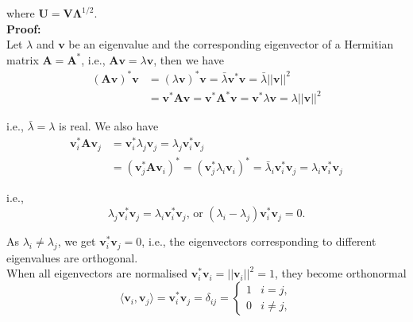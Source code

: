 \documentclass[10pt,b5paper,titlepage]{book}
\begin{document}
\begin{itemize}
where $\mathbf{U} = \mathbf{V}\mathbf{\Lambda}^{1/2}$.\\

\textbf{Proof:}\\

Let $\lambda$ and $\mathbf{v}$ be an eigenvalue and the corresponding eigenvector of a Hermitian matrix $\mathbf{A} = \mathbf{A}^{*}$, i.e., $\mathbf{A}\mathbf{v} = \lambda\mathbf{v}$, then we have
\begin{equation}
\begin{array}{ll}
(\mathbf{A}\mathbf{v})^{*}\mathbf{v} & = (\lambda\mathbf{v})^{*}\mathbf{v} = \bar{\lambda}\mathbf{v}^{*}\mathbf{v} = \bar{\lambda}||\mathbf{v}||^{2}\\
& = \mathbf{v}^{*}\mathbf{A}\mathbf{v} = \mathbf{v}^{*}\mathbf{A}^{*}\mathbf{v} = \mathbf{v}^{*}\lambda\mathbf{v} = \lambda||\mathbf{v}||^{2}
\end{array}
\end{equation}

i.e., $\bar{\lambda} = \lambda$ is real. We also have
\begin{equation}
\begin{array}{ll}
\mathbf{v}_{i}^{*}\mathbf{A}\mathbf{v}_{j} & = \mathbf{v}_{i}^{*}\lambda_{j}\mathbf{v}_{j} = \lambda_{j}\mathbf{v}_{i}^{*}\mathbf{v}_{j}\\
& = (\mathbf{v}_{j}^{*}\mathbf{A}\mathbf{v}_{i})^{*} = (\mathbf{v}_{j}^{*}\lambda_{i}\mathbf{v}_{i})^{*} = \bar{\lambda}_{i}\mathbf{v}_{i}^{*}\mathbf{v}_{j} = \lambda_{i}\mathbf{v}_{i}^{*}\mathbf{v}_{j}
\end{array}
\end{equation}

i.e.,
\begin{equation}
\lambda_{j}\mathbf{v}_{i}^{*}\mathbf{v}_{j} = \lambda_{i}\mathbf{v}_{i}^{*}\mathbf{v}_{j}
\text{, or }
(\lambda_{i}-\lambda_{j})\mathbf{v}_{i}^{*}\mathbf{v}_{j} = 0
.\end{equation}

As $\lambda_{i} \neq \lambda_{j}$, we get $\mathbf{v}_{i}^{*}\mathbf{v}_{j} = 0$, i.e., the eigenvectors corresponding to different eigenvalues are orthogonal.\\

When all eigenvectors are normalised $\mathbf{v}_{i}^{*}\mathbf{v}_{i} = ||\mathbf{v}_{i}||^{2} = 1$, they become orthonormal
\begin{equation}
\langle{\mathbf{v}_{i},\mathbf{v}_{j}}\rangle = \mathbf{v}_{i}^{*}\mathbf{v}_{j} = \delta_{ij} = 
\left \{
\begin{array}{ll}
1 & i = j,\\
0 & i \neq j,
\end{array} \right
.\end{equation}


\end{itemize}
\end{document}
